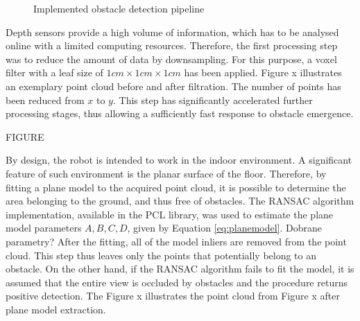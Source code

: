 \begin{figure}[H]
\begin{center}

\caption{Implemented obstacle detection pipeline}

\label{fig:detectpipe}

\end{center}
\end{figure}

Depth sensors provide a high volume of information, which has to be analysed online with a limited computing resources. Therefore, the first processing step was to reduce the amount of data by downsampling. For this purpose, a voxel filter with a leaf size of $1cm \times 1cm \times 1cm$ has been applied. Figure x illustrates an exemplary point cloud before and after filtration. The number of points has been reduced from $x$ to $y$. This step has significantly accelerated further processing stages, thus allowing a sufficiently fast response to obstacle emergence.

FIGURE

By design, the robot is intended to work in the indoor environment. A significant feature of such environment is the planar surface of the floor. Therefore, by fitting a plane model to the acquired point cloud, it is possible to determine the  area belonging to the ground, and thus free of obstacles. The RANSAC algorithm implementation, available in the PCL library, was used to estimate the plane model parameters $A,B,C,D$, given by Equation \ref{eq:planemodel}. Dobrane parametry? After the fitting, all of the model inliers are removed from the point cloud. This step thus leaves only the points that potentially belong to an obstacle. On the other hand, if the RANSAC algorithm fails to fit the model, it is assumed that the entire view is occluded by obstacles and the procedure returns positive detection.  The Figure x illustrates the point cloud from Figure x after plane model extraction.


